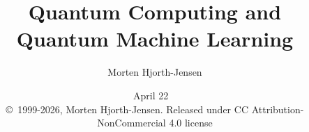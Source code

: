 \documentclass{beamer}
\begin{document}

\newcommand{\exercisesection}[1]{\subsection*{#1}}







\title{Quantum Computing and Quantum Machine Learning}


\author{Morten Hjorth-Jensen}

\date{April 22
\ \\ 
{\tiny \copyright\ 1999-2026, Morten Hjorth-Jensen. Released under CC Attribution-NonCommercial 4.0 license}
}

\begin{frame}
\titlepage
\end{frame}
\end{document}
